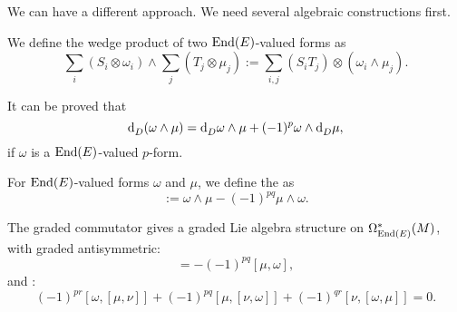 \documentclass[openany, oneside, a5paper]{book}
\begin{document}
We can have a different approach.
We need several algebraic constructions first.

We define the wedge product of two $\operatorname{End}(E)$-valued forms as
\begin{equation}
    \sum_i (S_i \otimes \omega_i) \wedge \sum_j(T_j \otimes \mu_j) 
    := \sum_{i, j} (S_i T_j) \otimes (\omega_i \wedge \mu_j).
\end{equation}


It can be proved that
\begin{equation}
    \mathop{}\!\mathrm{d}^{}_D (\omega \wedge \mu) = \mathop{}\!\mathrm{d}^{}_D \omega \wedge \mu + (-1)^p \omega \wedge \mathop{}\!\mathrm{d}^{}_D \mu,
\end{equation}
if $\omega$ is a $\operatorname{End}(E)$-valued $p$-form.

\begin{definition}
    For $\operatorname{End}(E)$-valued forms $\omega$ and $\mu$, we define the  as
    \begin{equation}
        [\omega, \mu] := \omega \wedge \mu - (-1)^{pq} \mu \wedge \omega.
    \end{equation}
\end{definition}

The graded commutator gives a graded Lie algebra structure on $\Omega^*_{\operatorname{End}(E)}(M)$, with graded antisymmetric:
\begin{equation}
    [\omega, \mu] = - (-1)^{pq} [\mu, \omega],
\end{equation}
and :
\begin{equation}
    (-1)^{pr} [\omega, [\mu, \nu]] + (-1)^{pq} [\mu, [\nu, \omega]] + (-1)^{qr} [\nu, [\omega, \mu]] = 0.
\end{equation}
\end{document}
